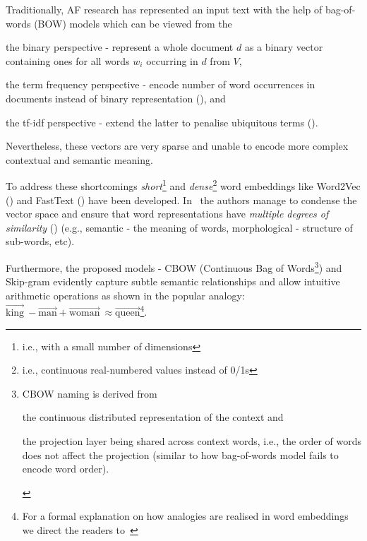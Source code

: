 Traditionally, AF research has represented an input text with the help of bag-of-words (BOW) models which can be viewed from the  \begin{enumerate*}
    \item the binary perspective - represent a whole document $d$ as a binary vector containing ones for all words $w_{i}$ occurring in $d$ from $V$, 
    \item the term frequency perspective - encode number of word occurrences in documents instead of binary representation (\cite{Xu2013AnAT}), and 
    \item the tf-idf perspective - extend the latter to penalise ubiquitous terms (\cite{SprckJones1972ASI}).
\end{enumerate*} 
Nevertheless, these vectors are very sparse and unable to encode more complex contextual and semantic meaning.

To address these shortcomings \emph{short}\footnote{i.e., with a small number of dimensions} and \emph{dense}\footnote{i.e., continuous real-numbered values instead of 0/1s} word embeddings like Word2Vec (\cite{mikolov2013efficient}) and FastText (\cite{bojanowski-etal-2017-enriching}) have been developed.
In~\cite{mikolov2013efficient} the authors manage to condense the vector space and ensure that word representations have \emph{multiple degrees of similarity} (\cite{mikolov-etal-2013-linguistic}) (e.g., semantic - the meaning of words, morphological - structure of sub-words, etc).


Furthermore, the proposed models - CBOW (Continuous Bag of Words\footnote{
    CBOW naming is derived from \begin{enumerate*}
        \item the continuous distributed representation of the context and 
        \item the projection layer being shared across context words, i.e., the order of words does not affect the projection (similar to how bag-of-words model fails to encode word order).     
    \end{enumerate*} 
}) and Skip-gram evidently capture subtle semantic relationships and allow intuitive arithmetic operations as shown in the popular analogy: $\overrightarrow{\text{king}}\ - \overrightarrow{\text{man}} +\overrightarrow{\text{woman}}\ \approx \overrightarrow{\text{queen}}$\footnote{
    For a formal explanation on how analogies are realised in word embeddings we direct the readers to~\cite{ethayarajh-etal-2019-towards}
}.


